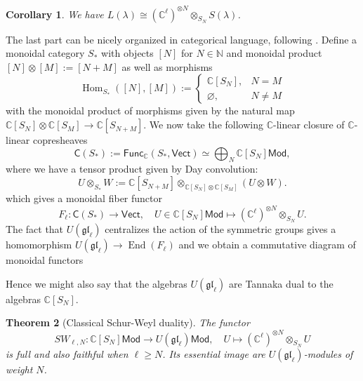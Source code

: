 \documentclass[11pt]{report}
\newtheorem{theorem}{Theorem}[section]
\newtheorem{corollary}[theorem]{Corollary}
\theoremstyle{definition}
\theoremstyle{remark}
\theoremstyle{remark}
\newcommand{\Hom}{\operatorname{Hom}}
\newcommand{\End}{\operatorname{End}}
\newcommand{\N}{\mathbb{N}}
\newcommand{\C}{\mathbb{C}}
\begin{document}
\begin{corollary}\label{corollary:SchurWeyl}
We have $L(\lambda) \cong (\C^\ell)^{\otimes N} \otimes_{S_N} S(\lambda)$.
\end{corollary}

The last part can be nicely organized in categorical language, following \cite{article:davydov:2010}. Define a monoidal category $S_*$ with objects $[N]$ for $N \in \N$ and monoidal product $[N] \otimes [M] := [N+M]$ as well as morphisms
\begin{equation*}
\Hom_{S_*}([N],[M]) :=
\begin{cases}
\C[S_N], & N = M \\
\varnothing, & N \neq M
\end{cases}
\end{equation*}
with the monoidal product of morphisms given by the natural map $\C[S_N] \otimes \C[S_M] \to \C[S_{N+M}]$. We now take the following $\C$-linear closure of $\C$-linear copresheaves
\begin{equation*}
\mathsf{C}(S_*) := \mathsf{Func}_\C(S_*,\mathsf{Vect}) \simeq \bigoplus_N \C[S_N]\mathsf{Mod},
\end{equation*}
where we have a tensor product given by Day convolution:
\begin{equation*}
U \otimes_{S_*} W := \C[S_{N+M}] \otimes_{\C[S_N] \otimes \C[S_M]} (U \otimes W).
\end{equation*}
which gives a monoidal fiber functor
\begin{equation*}
F_\ell: \mathsf{C}(S_*) \to \mathsf{Vect}, \quad U \in \C[S_N]\mathsf{Mod} \mapsto (\C^\ell)^{\otimes N} \otimes_{S_N} U.
\end{equation*}
The fact that $U(\mathfrak{gl}_\ell)$ centralizes the action of the symmetric groups gives a homomorphism $U(\mathfrak{gl}_\ell) \to \End(F_\ell)$ and we obtain a commutative diagram of monoidal functors
\begin{center}
\end{center}
Hence we might also say that the algebras $U(\mathfrak{gl}_\ell)$ are Tannaka dual to the algebras $\C[S_N]$.

\begin{theorem}[Classical Schur-Weyl duality]
The functor
\begin{equation*}
SW_{\ell,N}: \C[S_N]\mathsf{Mod} \to U(\mathfrak{gl}_\ell)\mathsf{Mod}, \quad U \mapsto (\C^\ell)^{\otimes N} \otimes_{S_N} U
\end{equation*}
is full and also faithful when $\ell \geq N$. Its essential image are $U(\mathfrak{gl}_\ell)$-modules of weight $N$.
\end{theorem}
\end{document}
